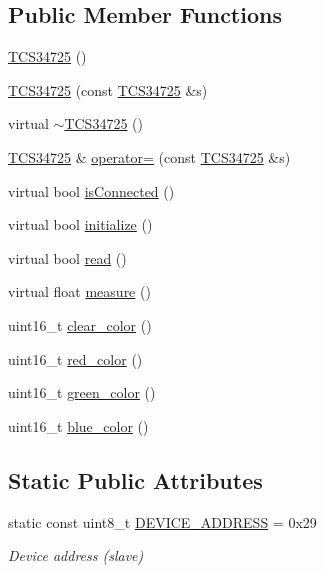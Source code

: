 \subsection*{Public Member Functions}
\begin{DoxyCompactItemize}
\item 
\hyperlink{classsmrtobj_1_1i2c_1_1_t_c_s34725_a93b35e7535650d4cc3fe256f1e4476c6}{T\+C\+S34725} ()
\item 
\hyperlink{classsmrtobj_1_1i2c_1_1_t_c_s34725_acd2fd6356b8be9598e26d1fbf8550577}{T\+C\+S34725} (const \hyperlink{classsmrtobj_1_1i2c_1_1_t_c_s34725}{T\+C\+S34725} \&s)
\item 
virtual \hyperlink{classsmrtobj_1_1i2c_1_1_t_c_s34725_a4d195655be451fe5b8a5abd233af6f42}{$\sim$\+T\+C\+S34725} ()
\item 
\hyperlink{classsmrtobj_1_1i2c_1_1_t_c_s34725}{T\+C\+S34725} \& \hyperlink{classsmrtobj_1_1i2c_1_1_t_c_s34725_a9360d2d145664e2724a449b05aa21d7a}{operator=} (const \hyperlink{classsmrtobj_1_1i2c_1_1_t_c_s34725}{T\+C\+S34725} \&s)
\item 
virtual bool \hyperlink{classsmrtobj_1_1i2c_1_1_t_c_s34725_af9018c2f326e228d998866692393090f}{is\+Connected} ()
\item 
virtual bool \hyperlink{classsmrtobj_1_1i2c_1_1_t_c_s34725_ace72ff801097ec771026acd605de2d53}{initialize} ()
\item 
virtual bool \hyperlink{classsmrtobj_1_1i2c_1_1_t_c_s34725_ae00be04f529c449287ac9329df3cb7a7}{read} ()
\item 
virtual float \hyperlink{classsmrtobj_1_1i2c_1_1_t_c_s34725_a4318a15406a82e2ccfe9624653e4f37a}{measure} ()
\item 
uint16\+\_\+t \hyperlink{classsmrtobj_1_1i2c_1_1_t_c_s34725_a2ac58333faa1b9f8aea4614c11e7229f}{clear\+\_\+color} ()
\item 
uint16\+\_\+t \hyperlink{classsmrtobj_1_1i2c_1_1_t_c_s34725_aea6fa83010c4f2f476e7917db3b64b17}{red\+\_\+color} ()
\item 
uint16\+\_\+t \hyperlink{classsmrtobj_1_1i2c_1_1_t_c_s34725_a7369ef26040b99b27b981de1aa2f38e2}{green\+\_\+color} ()
\item 
uint16\+\_\+t \hyperlink{classsmrtobj_1_1i2c_1_1_t_c_s34725_a30ee968bf672b9ea3f019dd1046001f0}{blue\+\_\+color} ()
\end{DoxyCompactItemize}
\subsection*{Static Public Attributes}
\begin{DoxyCompactItemize}
\item 
\hypertarget{classsmrtobj_1_1i2c_1_1_t_c_s34725_afb6d3e6f4aed5558a246351db358a9da}{}static const uint8\+\_\+t \hyperlink{classsmrtobj_1_1i2c_1_1_t_c_s34725_afb6d3e6f4aed5558a246351db358a9da}{D\+E\+V\+I\+C\+E\+\_\+\+A\+D\+D\+R\+E\+S\+S} = 0x29\label{classsmrtobj_1_1i2c_1_1_t_c_s34725_afb6d3e6f4aed5558a246351db358a9da}

\begin{DoxyCompactList}\small\item\em Device address (slave) \end{DoxyCompactList}\end{DoxyCompactItemize}
